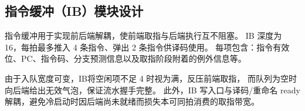 \subsection{指令缓冲（IB）模块设计}

指令缓冲用于实现前后端解耦，使前端取指与后端执行互不阻塞。
IB 深度为 16，每拍最多推入 4 条指令、弹出 2 条指令供译码使用。
每项包含：指令有效位、PC、指令码、分支预测信息以及取指阶段附着的例外信息等。

由于入队宽度可变，IB将空闲项不足 4 时视为满，反压前端取指，
而队列为空时向后端给出无效气泡，保证流水握手完整。
此外，IB 写入口与译码/重命名 ready 解耦，避免冷启动时因后端尚未就绪而损失本可同拍消费的取指带宽。

